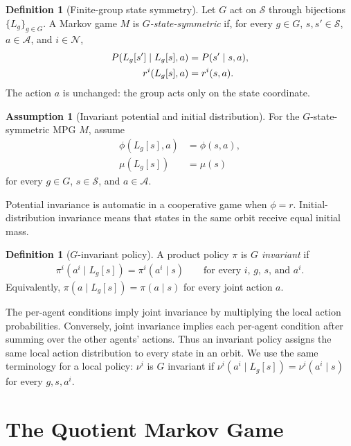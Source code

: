 \documentclass{article}
\theoremstyle{plain}
\theoremstyle{definition}
\newtheorem{definition}[theorem]{Definition}
\newtheorem{assumption}[theorem]{Assumption}
\theoremstyle{remark}
\newcommand{\N}{\mathcal{N}}
\newcommand{\St}{\mathcal{S}}
\newcommand{\Ac}{\mathcal{A}}
\begin{document}
\begin{definition}[Finite-group state symmetry]
\label{def:g-symmetric-mg}
Let $G$ act on $\St$ through bijections $\{L_g\}_{g\in G}$. A Markov game
$M$ is \emph{$G$-state-symmetric} if, for every
$g\in G$, $s,s'\in\St$, $a\in\Ac$, and $i\in\N$,
\begin{align}
  P(L_g[s']\mid L_g[s],a)
  &=P(s'\mid s,a),
  \label{eq:transition-equivariance}\\
  r^i(L_g[s],a)
  &=r^i(s,a).
  \notag
\end{align}
The action $a$ is unchanged: the group acts only on the state coordinate.
\end{definition}

\begin{assumption}[Invariant potential and initial distribution]
\label{assumption:symmetry}
For the $G$-state-symmetric MPG $M$, assume
\begin{align*}
  \phi(L_g[s],a)
  &=\phi(s,a),
  \\
  \mu(L_g[s])
  &=\mu(s)
\end{align*}
for every $g\in G$, $s\in\St$, and $a\in\Ac$.
\end{assumption}

Potential invariance is automatic in a cooperative game when $\phi=r$.
Initial-distribution invariance means that states in the same orbit receive equal
initial mass.

\begin{definition}[$G$-invariant policy]
\label{def:g-invariant-policy}
A product policy $\pi$ is \emph{$G$ invariant} if
\begin{align*}
  \pi^i(a^i\mid L_g[s])
  =
  \pi^i(a^i\mid s)
  \qquad
  \text{for every $i$, $g$, $s$, and $a^i$.}
\end{align*}
Equivalently,
$\pi(a\mid L_g[s])=\pi(a\mid s)$ for every joint action $a$.
\end{definition}

The per-agent conditions imply joint invariance by multiplying the local action
probabilities. Conversely, joint invariance implies each per-agent condition after
summing over the other agents' actions. Thus an invariant policy assigns the same
local action distribution to every state in an orbit.
We use the same terminology for a local policy: $\nu^i$ is $G$ invariant if
$\nu^i(a^i\mid L_g[s])=\nu^i(a^i\mid s)$ for every $g,s,a^i$.

\section{The Quotient Markov Game}
\label{sec:quotient}
\end{document}
